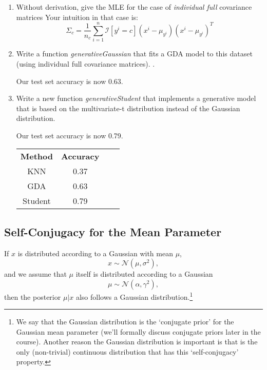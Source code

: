\documentclass{article}
\begin{document}
\begin{enumerate}
 \item Without derivation, give the MLE for the case of \emph{individual full} covariance matrices
 Your intuition in that case is:
 \[
 \Sigma_c = \frac{1}{n_c} \sum_{i=1}^n \mathcal{I}[y^i=c] (x^i - \mu_{y^i})(x^i - \mu_{y^i})^T
 \]

 \item  Write a function \emph{generativeGaussian} that fits a GDA model to this dataset (using individual full covariance matrices). .

 

 Our test set accuracy is now 0.63.

 \item Write a new function \emph{generativeStudent} that implements a generative model that is based on the multivariate-t distribution instead of the Gaussian distribution.  
 

 Our test set accuracy is now 0.79.

 \begin{tabular}[h]{cccc}
  \textbf{Method} & \textbf{Accuracy}\\
  KNN & 0.37\\
  GDA & 0.63\\
  Student & 0.79
\end{tabular}

\end{enumerate}



\subsection{Self-Conjugacy for the Mean Parameter}

If $x$ is distributed according to a Gaussian with mean $\mu$,
\[
x \sim \mathcal{N}(\mu,\sigma^2),
\]
and we assume that $\mu$ itself is distributed according to a Gaussian
\[
\mu \sim \mathcal{N}(\alpha,\gamma^2),
\]
then the posterior $\mu | x$ also follows a Gaussian distribution.\footnote{We say that the Gaussian distribution is the `conjugate prior' for the Gaussian mean parameter (we'll formally discuss conjugate priors later in the course). Another reason the Gaussian distribution is important is that is the only (non-trivial) continuous distribution that has this `self-conjugacy' property.}  %
\end{document}
